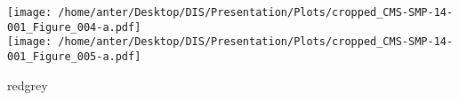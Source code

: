 \begin{frame}
\begin{minipage}[thbp]{0.6\textwidth}
\end{minipage}
\hspace*{-2mm}
\begin{minipage}[thbp]{0.1\textwidth}
\vspace{-6mm}
\hspace*{0mm}\texttt{[image: /home/anter/Desktop/DIS/Presentation/Plots/cropped\_CMS-SMP-14-001\_Figure\_004-a.pdf]}\\
\hspace*{0mm}\texttt{[image: /home/anter/Desktop/DIS/Presentation/Plots/cropped\_CMS-SMP-14-001\_Figure\_005-a.pdf]}\\
\hspace*{20mm}\begin{beamercolorbox}[wd=23mm,ht=1mm,center,shadow=true, rounded=true]{redgrey}
{}
{\scalebox {0.61} {}}
\end{beamercolorbox}
\end{minipage}
\end{frame}

